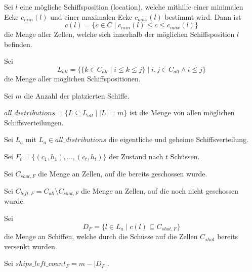 \documentclass[a4paper,12pt]{llncs}
\numberwithin{equation}{section}
\begin{document}
\begin{definition}
Sei $l$ eine mögliche Schiffsposition (location), welche mithilfe einer minimalen Ecke $c_{min}(l)$ und einer maximalen Ecke $c_{max}(l)$ bestimmt wird. Dann ist
\[
c(l)=
\{
c
\in
C
\mid
c_{min}(l) \leq c \leq c_{max}(l)
\}
\]
die Menge aller Zellen, welche sich innerhalb der möglichen Schiffsposition $l$ befinden.
\end{definition}

\begin{definition}
Sei 
\[
L_{all}=
\{
\{
k
\in
C_{all}
\mid
i \leq k \leq j
\}
\mid
i,j \in C_{all}
\wedge
i \leq j
\}
\] die Menge aller möglichen Schiffspositionen.
\end{definition}

\begin{definition}
Sei $m$ die Anzahl der platzierten Schiffe.
\end{definition}

\begin{definition}
$all\_distributions=\{L \subseteq L_{all} \mid |L|=m\}$ ist die Menge von allen möglichen Schiffsverteilungen.
\end{definition}

\begin{definition}
Sei $L_a$ mit $L_a \in all\_distributions$ die eigentliche und geheime Schiffsverteilung.
\end{definition}

\begin{definition}
Sei $F_t=\{(c_1, h_1), \dots , (c_t, h_t)\}$ der Zustand nach $t$ Schüssen.
\end{definition}

\begin{definition}
Sei $C_{shot,F}$ die Menge an Zellen, auf die bereits geschossen wurde.
\end{definition}

\begin{definition}
Sei $C_{left,F}=C_{all} \setminus C_{shot,F}$ die Menge an Zellen, auf die noch nicht geschossen wurde.
\end{definition}

\begin{definition}
Sei
\[
D_F=\{l \in L_a \mid c(l) \subseteq C_{shot,F}\}
\]
die Menge an Schiffen, welche durch die Schüsse auf die Zellen $C_{shot}$ bereits versenkt wurden.
\end{definition}

\begin{definition}
Sei $ships\_left\_count_F=m - |D_F|$.
\end{definition}
\end{document}
